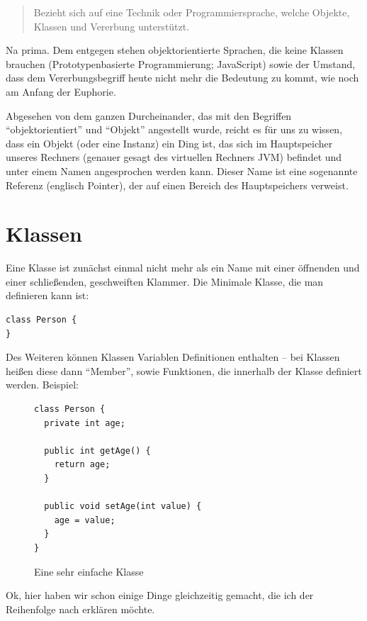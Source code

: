 \begin{quote}
Bezieht sich auf eine Technik oder Programmiersprache, welche Objekte, Klassen und Vererbung unterstützt.
\end{quote}

Na prima. Dem entgegen stehen objektorientierte Sprachen, die keine Klassen brauchen (Prototypenbasierte Programmierung; JavaScript) sowie der Umstand, dass dem Vererbungsbegriff heute nicht mehr die Bedeutung zu kommt, wie noch am Anfang der Euphorie. 

Abgesehen von dem ganzen Durcheinander, das mit den Begriffen "`objektorientiert"' und "`Objekt"' angestellt wurde, reicht es für uns zu wissen, dass ein Objekt (oder eine Instanz) ein Ding ist, das sich im Hauptspeicher unseres Rechners (genauer gesagt des virtuellen Rechners JVM) befindet und unter einem Namen angesprochen werden kann. Dieser Name ist eine sogenannte Referenz (englisch Pointer), der auf einen Bereich des Hauptspeichers verweist. 

\section{Klassen}

Eine Klasse ist zunächst einmal nicht mehr als ein Name mit einer öffnenden und einer schließenden, geschweiften Klammer. Die Minimale Klasse, die man definieren kann ist:
\begin{lstlisting}
class Person {
}
\end{lstlisting}
Des Weiteren können Klassen Variablen Definitionen enthalten -- bei Klassen heißen diese dann "`Member"', sowie Funktionen, die innerhalb der Klasse definiert werden. Beispiel:
\begin{figure}[h]
\begin{lstlisting}
class Person {
  private int age;

  public int getAge() {
    return age;
  }
  
  public void setAge(int value) {
    age = value;
  }
}
\end{lstlisting}
\caption{Eine sehr einfache Klasse}
\label{code:class}
\end{figure}

Ok, hier haben wir schon einige Dinge gleichzeitig gemacht, die ich der Reihenfolge nach erklären möchte.

